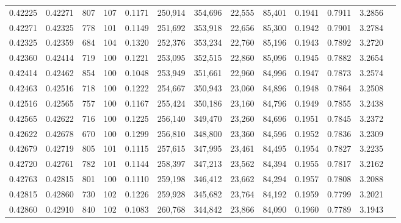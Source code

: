 \begin{tabular}{rrrrrrrrrrrrr}
0.42225 & 0.42271 &   807 & 107 &                                     0.1171 & 250,914 & 354,696 &  22,555 &  85,401 & 0.1941 & 0.7911 & 3.2856 \\
0.42271 & 0.42325 &   778 & 101 &                                     0.1149 & 251,692 & 353,918 &  22,656 &  85,300 & 0.1942 & 0.7901 & 3.2784 \\
0.42325 & 0.42359 &   684 & 104 &                                     0.1320 & 252,376 & 353,234 &  22,760 &  85,196 & 0.1943 & 0.7892 & 3.2720 \\
0.42360 & 0.42414 &   719 & 100 &                                     0.1221 & 253,095 & 352,515 &  22,860 &  85,096 & 0.1945 & 0.7882 & 3.2654 \\
0.42414 & 0.42462 &   854 & 100 &                                     0.1048 & 253,949 & 351,661 &  22,960 &  84,996 & 0.1947 & 0.7873 & 3.2574 \\
0.42463 & 0.42516 &   718 & 100 &                                     0.1222 & 254,667 & 350,943 &  23,060 &  84,896 & 0.1948 & 0.7864 & 3.2508 \\
0.42516 & 0.42565 &   757 & 100 &                                     0.1167 & 255,424 & 350,186 &  23,160 &  84,796 & 0.1949 & 0.7855 & 3.2438 \\
0.42565 & 0.42622 &   716 & 100 &                                     0.1225 & 256,140 & 349,470 &  23,260 &  84,696 & 0.1951 & 0.7845 & 3.2372 \\
0.42622 & 0.42678 &   670 & 100 &                                     0.1299 & 256,810 & 348,800 &  23,360 &  84,596 & 0.1952 & 0.7836 & 3.2309 \\
0.42679 & 0.42719 &   805 & 101 &                                     0.1115 & 257,615 & 347,995 &  23,461 &  84,495 & 0.1954 & 0.7827 & 3.2235 \\
0.42720 & 0.42761 &   782 & 101 &                                     0.1144 & 258,397 & 347,213 &  23,562 &  84,394 & 0.1955 & 0.7817 & 3.2162 \\
0.42763 & 0.42815 &   801 & 100 &                                     0.1110 & 259,198 & 346,412 &  23,662 &  84,294 & 0.1957 & 0.7808 & 3.2088 \\
0.42815 & 0.42860 &   730 & 102 &                                     0.1226 & 259,928 & 345,682 &  23,764 &  84,192 & 0.1959 & 0.7799 & 3.2021 \\
0.42860 & 0.42910 &   840 & 102 &                                     0.1083 & 260,768 & 344,842 &  23,866 &  84,090 & 0.1960 & 0.7789 & 3.1943 \\

\end{tabular}
